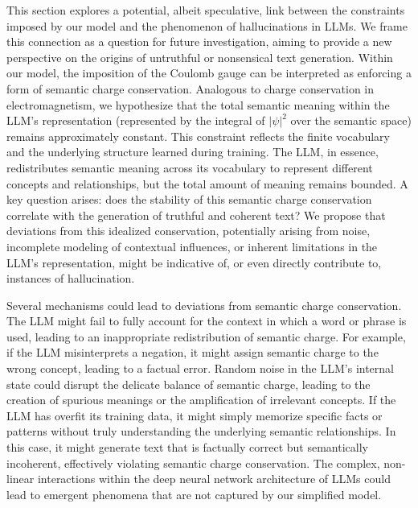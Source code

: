 \documentclass[prd,amsmath,amssymb,12pt]{revtex4}
\begin{document}
This section explores a potential, albeit speculative, link between the constraints imposed by
our model and the phenomenon of hallucinations in LLMs. We frame this connection as a question for
future investigation, aiming to provide a new perspective on the origins of untruthful or nonsensical
text generation. Within our model, the imposition of the Coulomb gauge can be interpreted as
enforcing a form of semantic charge conservation. Analogous to charge conservation in electromagnetism,
we hypothesize that the total semantic meaning within the LLM's representation
(represented by the integral of $|\psi|^2$ over the semantic space) remains approximately constant.
This constraint reflects the finite vocabulary and the underlying structure learned during training.
The LLM, in essence, redistributes semantic meaning across its vocabulary to represent different
concepts and relationships, but the total amount of meaning remains bounded. A key question arises:
does the stability of this semantic charge conservation correlate with the generation of truthful
and coherent text? We propose that deviations from this idealized conservation, potentially arising
from noise, incomplete modeling of contextual influences, or inherent limitations in the LLM's
representation, might be indicative of, or even directly contribute to, instances of hallucination.

Several mechanisms could lead to deviations from semantic charge conservation. The LLM might fail
to fully account for the context in which a word or phrase is used, leading to an inappropriate
redistribution of semantic charge. For example, if the LLM misinterprets a negation, it might
assign semantic charge to the wrong concept, leading to a factual error. Random noise in the
LLM's internal state could disrupt the delicate balance of semantic charge, leading to the
creation of spurious meanings or the amplification of irrelevant concepts. If the LLM has
overfit its training data, it might simply memorize specific facts or patterns without truly
understanding the underlying semantic relationships. In this case, it might generate text
that is factually correct but semantically incoherent, effectively violating semantic charge
conservation. The complex, non-linear interactions within the deep neural network
architecture of LLMs could lead to emergent phenomena that are not captured by our simplified model.
\end{document}
